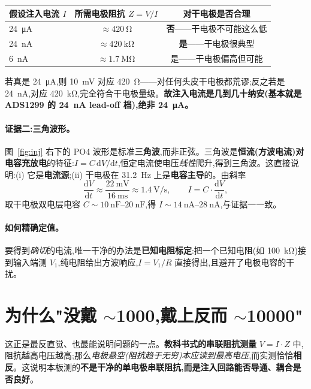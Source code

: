 \documentclass[11pt]{ctexart}
\begin{document}
\begin{center}
\begin{tabular}{@{}lcc@{}}
\toprule
假设注入电流 $I$ & 所需电极阻抗 $Z=V/I$ & 对干电极是否合理 \\
\midrule
\SI{24}{\micro\ampere} & $\approx \SI{420}{\ohm}$ & \textcolor{bad}{\textbf{否}}——干电极不可能这么低 \\
\SI{24}{\nano\ampere} & $\approx \SI{420}{\kilo\ohm}$ & \textcolor{good}{\textbf{是}}——干电极很典型 \\
\SI{6}{\nano\ampere} & $\approx \SI{1.7}{\mega\ohm}$ & \textcolor{good}{是}——干电极偏高但可能 \\
\bottomrule
\end{tabular}
\end{center}

\noindent 若真是 \SI{24}{\micro\ampere},则 \SI{10}{\milli\volt} 对应 \SI{420}{\ohm}——对任何头皮干电极都荒谬;反之若是 \SI{24}{\nano\ampere},对应 \SI{420}{\kilo\ohm},完全符合干电极量级。\textbf{故注入电流是几到几十纳安(基本就是 ADS1299 的 \SI{24}{\nano\ampere} lead-off 档),绝非 \SI{24}{\micro\ampere}。}

\paragraph{证据二:三角波形。}图~\ref{fig:inj} 右下的 PO4 波形是标准\textbf{三角波},而非正弦。三角波是\textbf{恒流(方波电流)对电容充放电}的特征:$I = C\,\mathrm{d}V/\mathrm{d}t$,恒定电流使电压\emph{线性}爬升,得到三角波。这直接说明:(i) 它是\textbf{电流源};(ii) 干电极在 \SI{31.2}{\hertz} 上是\textbf{电容主导}的。由斜率
\[
\frac{\mathrm{d}V}{\mathrm{d}t}\approx\frac{\SI{22}{\milli\volt}}{\SI{16}{\milli\second}}\approx \SI{1.4}{\volt\per\second},\qquad
I = C\cdot\frac{\mathrm{d}V}{\mathrm{d}t},
\]
取干电极双电层电容 $C\sim\SIrange{10}{20}{\nano\farad}$,得 $I\sim\SIrange{14}{28}{\nano\ampere}$,与证据一一致。

\paragraph{如何精确定值。}要得到\emph{确切}的电流,唯一干净的办法是\textbf{已知电阻标定}:把一个已知电阻(如 \SI{100}{\kilo\ohm})接到输入端测 $V_1$,纯电阻给出方波响应,$I=V_1/R$ 直接得出,且避开了电极电容的干扰。

\section{为什么"没戴 $\sim$1000,戴上反而 $\sim$10000"}
这正是最反直觉、也最能说明问题的一点。\textbf{教科书式的串联阻抗测量} $V=I\cdot Z$ 中,阻抗越高电压越高;那么\emph{电极悬空(阻抗趋于无穷)本应读到最高电压},而实测恰恰\textbf{相反}。这说明本板测的\textbf{不是干净的单电极串联阻抗,而是注入回路能否导通、耦合是否良好}。
\end{document}
